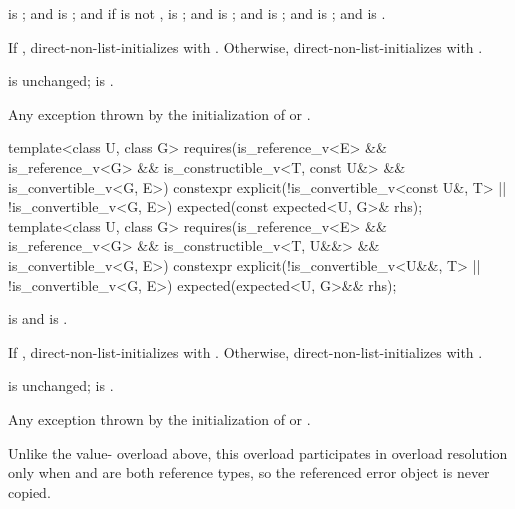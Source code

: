 \begin{itemdescr}
\pnum
\constraints
{} is ; and  is ; and if  is not ,  is ; and  is ; and  is ; and  is ; and  is .

\pnum
\effects
If , direct-non-list-initializes  with . Otherwise, direct-non-list-initializes  with .

\pnum
\ensures
{} is unchanged;  is .

\pnum
\throws
Any exception thrown by the initialization of  or .
\end{itemdescr}

%
\begin{itemdecl}
template<class U, class G>
  requires(is_reference_v<E> && is_reference_v<G> && is_constructible_v<T, const U&> &&
           is_convertible_v<G, E>)
constexpr explicit(!is_convertible_v<const U&, T> || !is_convertible_v<G, E>)
    expected(const expected<U, G>& rhs);
template<class U, class G>
  requires(is_reference_v<E> && is_reference_v<G> && is_constructible_v<T, U&&> &&
           is_convertible_v<G, E>)
constexpr explicit(!is_convertible_v<U&&, T> || !is_convertible_v<G, E>)
    expected(expected<U, G>&& rhs);
\end{itemdecl}

\begin{itemdescr}
\pnum
\constraints
{} is  and  is .

\pnum
\effects
If , direct-non-list-initializes  with . Otherwise, direct-non-list-initializes  with .

\pnum
\ensures
{} is unchanged;  is .

\pnum
\throws
Any exception thrown by the initialization of  or .

\pnum
\remarks
Unlike the value- overload above, this overload participates in overload resolution only when  and  are both reference types, so the referenced error object is never copied.
\end{itemdescr}

